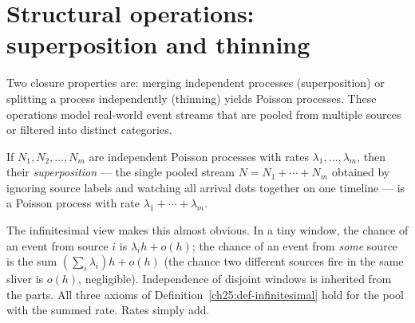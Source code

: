 \section{Structural operations: superposition and thinning}
\label{ch25:super-thin}

Two closure properties are: merging independent
processes (superposition) or splitting a process independently (thinning) yields Poisson
processes. These operations model real-world event streams that are pooled from multiple
sources or filtered into distinct categories.

\begin{theorem}[Superposition]
\label{ch25:thm-superposition}
If $N_1, N_2, \dots, N_m$ are independent Poisson processes with rates
$\lambda_1, \dots, \lambda_m$, then their \emph{superposition} --- the single pooled
stream $N = N_1 + \cdots + N_m$ obtained by ignoring source labels and watching all
arrival dots together on one timeline --- is a Poisson process with rate
$\lambda_1 + \cdots + \lambda_m$.
\end{theorem}

The infinitesimal view makes this almost obvious. In a tiny window, the chance of
an event from source $i$ is $\lambda_i h + o(h)$; the chance of an event from
\emph{some} source is the sum $(\sum_i \lambda_i)h + o(h)$ (the chance two
different sources fire in the same sliver is $o(h)$, negligible). Independence of
disjoint windows is inherited from the parts. All three axioms of
Definition~\ref{ch25:def-infinitesimal} hold for the pool with the summed rate.
Rates simply add.


